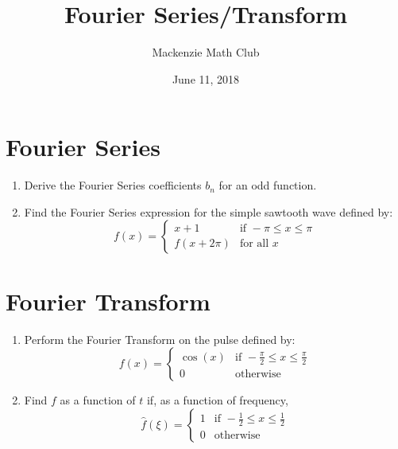 

\title{Fourier Series/Transform}
\author{Mackenzie Math Club}
\date{June 11, 2018}



\section{Fourier Series}
\begin{enumerate}
	\item{Derive the Fourier Series coefficients $b_n$ for an odd function.}
		\vspace*{3.5in}
	\item{Find the Fourier Series expression for the simple sawtooth wave defined by:
			\begin{equation*}
				f(x)=\begin{cases}
					x+1&\text{if }-\pi\leq x\leq\pi\\
					f(x+2\pi)&\text{for all }x
				\end{cases}
			\end{equation*}}
		\newpage
\end{enumerate}
\section{Fourier Transform}
\begin{enumerate}
	\item{Perform the Fourier Transform on the pulse defined by:
			\begin{equation*}
				f(x)=\begin{cases}
					\cos(x)&\text{if }-\frac{\pi}{2}\leq x\leq\frac{\pi}{2}\\
					0&\text{otherwise}
				\end{cases}
			\end{equation*}}
			\vspace*{3.5in}
		\item{Find $f$ as a function of $t$ if, as a function of frequency,
			\begin{equation*}
				\hat{f}(\xi) = \begin{cases}
					1&\text{if }-\frac{1}{2}\leq x\leq\frac{1}{2}\\
					0&\text{otherwise}
				\end{cases}
			\end{equation*}
		}
\end{enumerate}

